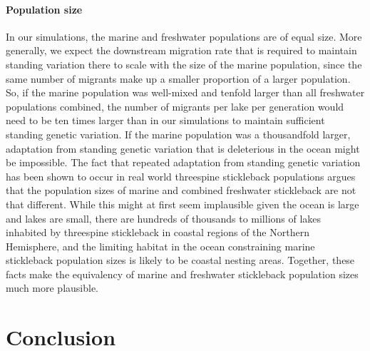 \documentclass{article}
\begin{document}
\paragraph{Population size}
In our simulations, 
the marine and freshwater populations are of equal size.
More generally, we expect the downstream migration rate that is required to maintain standing variation there
to scale with the size of the marine population,
since the same number of migrants make up a smaller proportion of a larger population.
So, if the marine population was well-mixed and tenfold larger than all freshwater populations combined,
the number of migrants per lake per generation would need to be ten times larger than in our simulations to maintain sufficient standing genetic variation.
If the marine population was a thousandfold larger,
adaptation from standing genetic variation that is deleterious in the ocean might be impossible. 
The fact that repeated adaptation from standing genetic variation has been shown to occur in real world threespine stickleback populations argues that the population sizes of marine and combined freshwater stickleback are not that different. 
While this might at first seem implausible given the ocean is large and lakes are small, 
there are hundreds of thousands to millions of lakes inhabited by threespine stickleback in coastal regions of the Northern Hemisphere, and the limiting habitat in the ocean constraining marine stickleback population sizes is likely to be coastal nesting areas. 
Together, these facts make the equivalency of marine and freshwater stickleback population sizes much more plausible.


\section*{Conclusion}
\end{document}

